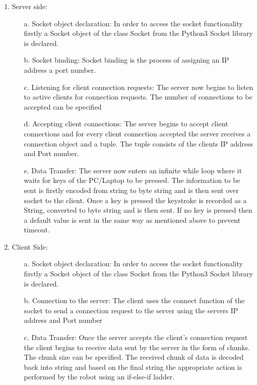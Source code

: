 \begin{enumerate}
\item Server side:
\begin{enumerate}
\item[a.] Socket object declaration: In order to access the socket functionality firstly a Socket object of the class Socket from the Python3 Socket library is declared.
\item[b.] Socket binding: Socket binding is the process of assigning an IP address a port number.
\item[c.] Listening for client connection requests: The server now begins to listen to active clients for connection requests. The number of connections to be accepted can be specified
\item[d.] Accepting client connections: The server begins to accept client connections and for every client connection accepted the server receives a connection object and a tuple. The tuple consists of the clients IP address and Port number.
\item[e.] Data Transfer: The server now enters an infinite while loop where it waits for keys of the PC/Laptop to be pressed. The information to be sent is firstly encoded from string to byte string and is then sent over socket to the client. Once a key is pressed the keystroke is recorded as a String, converted to byte string and is then sent. If no key is pressed then a default value is sent in the same way as mentioned above to prevent timeout.
\end{enumerate}
\item Client Side: 
\begin{enumerate}
\item[a.] Socket object declaration: In order to access the socket functionality firstly a Socket object of the class Socket from the Python3 Socket library is declared.
\item[b.] Connection to the server: The client uses the connect function of the socket to send a connection request to the server using the servers IP address and Port number
\item[c.] Data Transfer: Once the server accepts the client's connection request the client begins to receive data sent by the server in the form of chunks. The chunk size can be specified. The received chunk of data is decoded back into string and based on the final string the appropriate action is performed by the robot using an if-else-if ladder.
\end{enumerate}
\end{enumerate}
